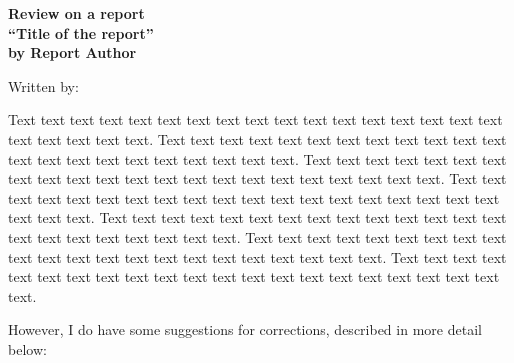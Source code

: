\documentclass[a4paper,11pt]{article}
\begin{document}
\pagestyle{empty}


  \begin{center}
{\large {\bf 
Review on a report \\
``Title of the report'' \\
by Report Author} \\

\bigskip

Written by: 

 
 } 
\end{center}

Text text text text text text text text text text text text text text text text text text text text text text.
Text text text text text text text text text text text text text text text text text text text text text text.
Text text text text text text text text text text text text text text text text text text text text text text.
Text text text text text text text text text text text text text text text text text text text text text text.
Text text text text text text text text text text text text text text text text text text text text text text.
Text text text text text text text text text text text text text text text text text text text text text text.
Text text text text text text text text text text text text text text text text text text text text text text.

However, I do have some suggestions for corrections,
described in more detail below:
\end{document}
